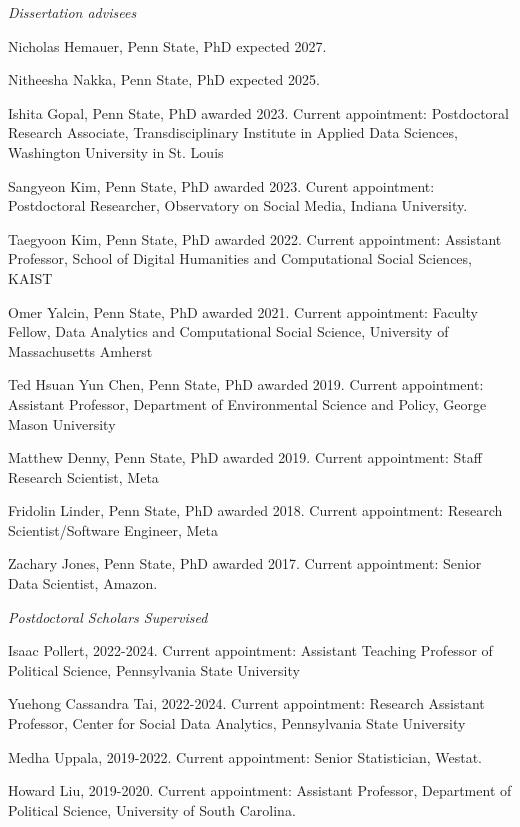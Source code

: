 \documentclass[overlapped,line]{res}
\begin{document}
\begin{resume}
\vspace{-.2cm}
\hspace{-1cm} \emph{Dissertation advisees}
\begin{etaremune}
\item Nicholas Hemauer, Penn State, PhD expected 2027.
\item Nitheesha Nakka, Penn State, PhD expected 2025.
\item Ishita Gopal, Penn State, PhD awarded 2023. Current appointment: Postdoctoral Research Associate, Transdisciplinary Institute in Applied Data Sciences, Washington University in St. Louis 
\item Sangyeon Kim, Penn State, PhD awarded 2023. Curent appointment:  Postdoctoral Researcher, Observatory on Social Media, Indiana University.
\item Taegyoon Kim, Penn State, PhD awarded 2022. Current appointment: Assistant Professor, School of Digital Humanities and Computational Social Sciences, KAIST
\item Omer Yalcin, Penn State, PhD awarded 2021. Current appointment: Faculty Fellow, Data Analytics and Computational Social Science, University of Massachusetts Amherst
\item Ted Hsuan Yun Chen, Penn State, PhD awarded 2019. Current appointment:  Assistant Professor, Department of Environmental Science and Policy, George Mason University
\item Matthew Denny, Penn State, PhD awarded 2019. Current appointment:  Staff Research Scientist, Meta
\item Fridolin Linder, Penn State, PhD awarded 2018. Current appointment: Research Scientist/Software Engineer, Meta
\item Zachary Jones, Penn State, PhD awarded 2017. Current appointment:  Senior Data Scientist, Amazon.

\end{etaremune}

\vspace{-.2cm}
\hspace{-1cm} \emph{Postdoctoral Scholars Supervised}
\begin{etaremune}
\item Isaac Pollert, 2022-2024. Current appointment: Assistant Teaching Professor of Political Science, Pennsylvania State University
\item Yuehong Cassandra Tai, 2022-2024. Current appointment: Research Assistant Professor, Center for Social Data Analytics, Pennsylvania State University
\item Medha Uppala, 2019-2022. Current appointment: Senior Statistician, Westat.
\item Howard Liu, 2019-2020. Current appointment: Assistant Professor, Department of Political Science, University of South Carolina.


\end{etaremune}
\end{resume}
\end{document}
